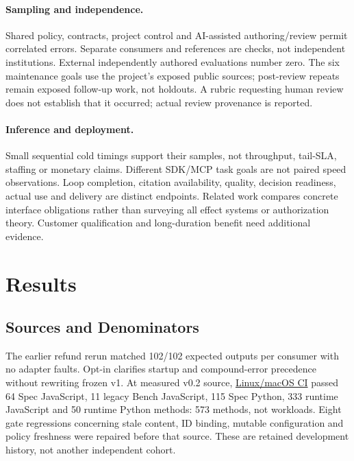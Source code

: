 \documentclass[11pt,letterpaper]{article}
\newcommand{\code}[1]{\texttt{\detokenize{#1}}}
\begin{document}
\paragraph{Sampling and independence.}
Shared policy, contracts, project control and AI-assisted authoring/review permit
correlated errors. Separate consumers and references are checks, not independent
institutions. External independently authored evaluations number zero. The six
maintenance goals use the project's exposed public sources; post-review repeats
remain exposed follow-up work, not holdouts. A rubric requesting human review
does not establish that it occurred; actual review provenance is reported.

\paragraph{Inference and deployment.}
Small sequential cold timings support their samples, not throughput, tail-SLA,
staffing or monetary claims. Different SDK/MCP task goals are not paired speed
observations. Loop completion, citation availability, quality, decision readiness,
actual use and delivery are distinct endpoints. Related work compares concrete
interface obligations rather than surveying all effect systems or authorization
theory. Customer qualification and long-duration benefit need additional evidence.

\section{Results}
\label{sec:results}

\subsection{Sources and Denominators}

The earlier refund rerun matched 102/102 expected outputs per consumer with no
adapter faults. Opt-in \code{offline-consumer-v1.1} clarifies startup and
compound-error precedence without rewriting frozen v1. At measured v0.2 source,
\href{https://github.com/OndCo/Action-Effect-Bench/actions/runs/39199258635}{Linux/macOS CI}
passed 64 Spec JavaScript, 11 legacy Bench JavaScript, 115 Spec Python, 333
runtime JavaScript and 50 runtime Python methods: 573 methods, not workloads.
Eight gate regressions concerning stale content, ID binding, mutable
configuration and policy freshness were repaired before that source. These
are retained development history, not another independent cohort.
\end{document}
